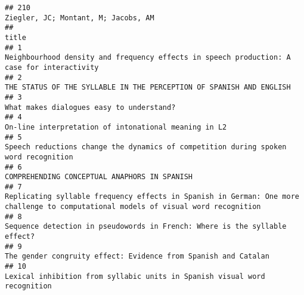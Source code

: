 \documentclass[
  english,
  man]{apa6}
\begin{document}
\begin{verbatim}
## 210                                                                                                                                                      Ziegler, JC; Montant, M; Jacobs, AM
##                                                                                                                                                                                                                                        title
## 1                                                                                                                                                 Neighbourhood density and frequency effects in speech production: A case for interactivity
## 2                                                                                                                                                                        THE STATUS OF THE SYLLABLE IN THE PERCEPTION OF SPANISH AND ENGLISH
## 3                                                                                                                                                                                                   What makes dialogues easy to understand?
## 4                                                                                                                                                                                       On-line interpretation of intonational meaning in L2
## 5                                                                                                                                                        Speech reductions change the dynamics of competition during spoken word recognition
## 6                                                                                                                                                                                               COMPREHENDING CONCEPTUAL ANAPHORS IN SPANISH
## 7                                                                                                         Replicating syllable frequency effects in Spanish in German: One more challenge to computational models of visual word recognition
## 8                                                                                                                                                                 Sequence detection in pseudowords in French: Where is the syllable effect?
## 9                                                                                                                                                                             The gender congruity effect: Evidence from Spanish and Catalan
## 10                                                                                                                                                                 Lexical inhibition from syllabic units in Spanish visual word recognition

\end{verbatim}
\end{document}

